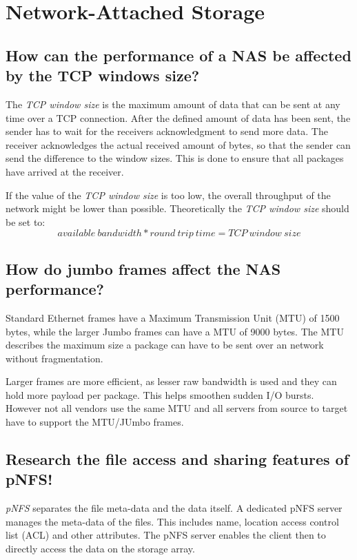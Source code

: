 \section{Network-Attached Storage} %
\label{sec:network_attached_storage}

\subsection{How can the performance of a NAS be affected by the TCP windows size?} %
\label{sub:how_can_the_performance_of_a_nas_be_affected_by_the_tcp_windows_size}
	The \emph{TCP window size} is the maximum amount of data
	that can be sent at any time over a TCP connection.
	After the defined amount of data has been sent,
	the sender has to wait for the receivers acknowledgment
	to send more data.
	The receiver acknowledges the actual received amount of bytes,
	so that the sender can send the difference to the window sizes.
	This is done to ensure that all packages have arrived at the receiver.

	If the value of the \emph{TCP window size} is too low,
	the overall throughput of the network might be lower than possible.
	Theoretically the \emph{TCP window size} should be set to:
	\begin{equation}
		available\ bandwidth * round\ trip\ time = TCP\ window\ size
	\end{equation}

\subsection{How do jumbo frames affect the NAS performance?} %
\label{sub:how_do_jumbo_frames_affect_the_nas_perfomance}
	Standard Ethernet frames have a Maximum Transmission Unit (MTU) of 1500 bytes,
	while the larger Jumbo frames can have a MTU of 9000 bytes.
	The MTU describes the maximum size a package can have
	to be sent over an network without fragmentation.

	Larger frames are more efficient,
	as lesser raw bandwidth is used
	and they can hold more payload per package.
	This helps smoothen sudden I/O bursts.\\
	However not all vendors use the same MTU
	and all servers from source to target have to support the MTU/JUmbo frames.
\subsection{Research the file access and sharing features of pNFS!} %
\label{sub:research_the_file_access_and_sharing_features_of_pnfs}
	\emph{pNFS} separates the file meta-data and the data itself.
	A dedicated pNFS server manages the meta-data of the files.
	This includes name, location access control list (ACL) and other attributes.
	The pNFS server enables the client then to directly access
	the data on the storage array.
